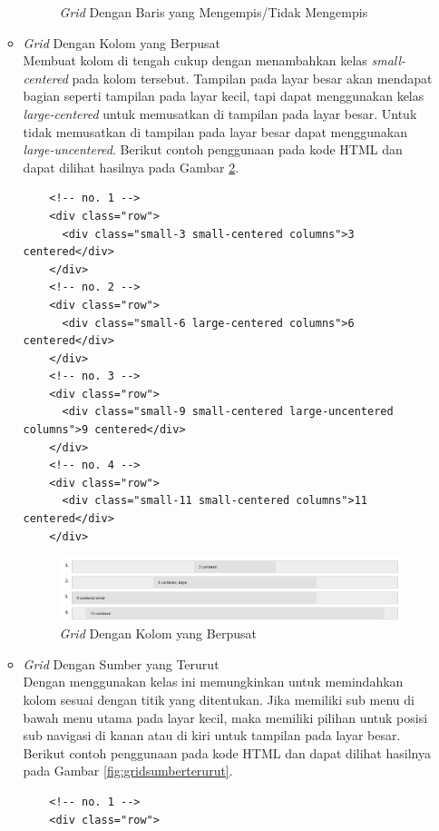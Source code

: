 \begin{enumerate}[(1)]
\begin{itemize}
\begin{figure}[H]
	\caption[{\it Grid} Dengan Baris yang Mengempis/Tidak Mengempis]{{\it Grid}
	Dengan Baris yang Mengempis/Tidak Mengempis}
	\label{fig:gridmengempis}
	\end{figure}
  \item {\it Grid} Dengan Kolom yang Berpusat\\
  Membuat kolom di tengah cukup dengan menambahkan kelas {\it small-centered}
  pada kolom tersebut. Tampilan pada layar besar akan mendapat bagian seperti
  tampilan pada layar kecil, tapi dapat menggunakan kelas {\it large-centered}
  untuk memusatkan di tampilan pada layar besar. Untuk tidak memusatkan di
  tampilan pada layar besar dapat menggunakan {\it large-uncentered}. Berikut
  contoh penggunaan pada kode HTML dan dapat dilihat hasilnya pada Gambar
  \ref{fig:gridkolomberpusat}.
  	\begin{lstlisting}
  	<!-- no. 1 -->
  	<div class="row">
	  <div class="small-3 small-centered columns">3 centered</div>
	</div>
	<!-- no. 2 -->
	<div class="row">
	  <div class="small-6 large-centered columns">6 centered</div>
	</div>
	<!-- no. 3 -->
	<div class="row">
	  <div class="small-9 small-centered large-uncentered columns">9 centered</div>
	</div>
	<!-- no. 4 -->
	<div class="row">
	  <div class="small-11 small-centered columns">11 centered</div>
	</div>
  	\end{lstlisting}
  	\begin{figure}[H]
	\centering
	\includegraphics[scale=0.6]{Gambar/gridkolomberpusat.png}
	\caption[{\it Grid} Dengan Kolom yang Berpusat]{{\it Grid} Dengan Kolom yang
	Berpusat}
	\label{fig:gridkolomberpusat}
	\end{figure}
  \item {\it Grid} Dengan Sumber yang Terurut\\
  Dengan menggunakan kelas ini memungkinkan untuk memindahkan kolom sesuai
  dengan titik yang ditentukan. Jika memiliki sub menu di bawah menu utama pada
  layar kecil, maka memiliki pilihan untuk posisi sub navigasi di kanan atau di
  kiri untuk tampilan pada layar besar. Berikut contoh penggunaan pada kode HTML
  dan dapat dilihat hasilnya pada Gambar \ref{fig:gridsumberterurut}.
  	\begin{lstlisting}
  	<!-- no. 1 -->
  	<div class="row">

\end{lstlisting}
\end{itemize}
\end{enumerate}
